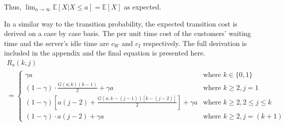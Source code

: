Thus, $\displaystyle \lim_{a \to \infty} \mathbb{E} [X | X \leq a] = \mathbb{E} [X]$ as expected.

In a similar way to the transition probability, the expected transition cost is derived on a case by case basis. The per unit time cost of the customers' waiting time and the server's idle time are $c_{W}$ and $c_{I}$ respectively. The full derivation is included in the appendix and the final equation is presented here.
\begin{multline}
	R_{a} (k, j) \\
	= \begin{cases}
		\gamma a & \text{where $k \in \{ 0, 1 \}$} \\
		(1 - \gamma) \cdot \frac{G (a; k) (k - 1)}{2} + \gamma a & \text{where $k \geq 2, j = 1$} \\
		(1 - \gamma) \left[ a (j - 2) + \frac{G (a; k - (j - 1)) [k - (j - 2)]}{2} \right] + \gamma a & \text{where $k \geq 2, 2 \leq j \leq k$} \\
		(1 - \gamma) \cdot a (j - 2) + \gamma a & \text{where $k \geq 2, j = (k + 1)$}
	\end{cases}
\end{multline}




































